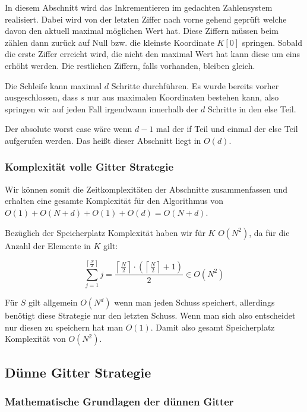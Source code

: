 \documentclass[a4paper,12pt]{llncs}
\numberwithin{equation}{section}
\begin{document}
In diesem Abschnitt wird das Inkrementieren im gedachten Zahlensystem realisiert. Dabei wird von der letzten Ziffer nach vorne gehend geprüft welche davon den aktuell maximal möglichen Wert hat. Diese Ziffern müssen beim zählen dann zurück auf Null bzw. die kleinste Koordinate $K[0]$ springen. Sobald die erste Ziffer erreicht wird, die nicht den maximal Wert hat kann diese um eins erhöht werden. Die restlichen Ziffern, falls vorhanden, bleiben gleich. 

Die Schleife kann maximal $d$ Schritte durchführen. Es wurde bereits vorher ausgeschlossen, dass $s$ nur aus maximalen Koordinaten bestehen kann, also springen wir auf jeden Fall irgendwann innerhalb der $d$ Schritte in den else Teil. 

Der absolute worst case wäre wenn $d-1$ mal der if Teil und einmal der else Teil aufgerufen werden. Das heißt dieser Abschnitt liegt in $O(d)$.

\subsubsection{Komplexität volle Gitter Strategie}

Wir können somit die Zeitkomplexitäten der Abschnitte zusammenfassen und erhalten eine gesamte Komplexität für den Algorithmus von $O(1)+O(N+d)+O(1)+O(d)=O(N+d)$.


Bezüglich der Speicherplatz Komplexität haben wir für $K$ $O(N^2)$, da für die Anzahl der Elemente in $K$ gilt:

\begin{equation}
\sum_{j=1}^{\left\lceil\frac{N}{2}\right\rceil}j=\frac{\left\lceil\frac{N}{2}\right\rceil\cdot\left(\left\lceil\frac{N}{2}\right\rceil+1\right)}{2}\in O\left(N^2\right)
\end{equation}


Für $S$ gilt allgemein $O(N^d)$ wenn man jeden Schuss speichert, allerdings benötigt diese Strategie nur den letzten Schuss. Wenn man sich also entscheidet nur diesen zu speichern hat man $O(1)$. Damit also gesamt Speicherplatz Komplexität von $O(N^2)$.


\subsection{Dünne Gitter Strategie}

\subsubsection{Mathematische Grundlagen der dünnen Gitter}
\end{document}

